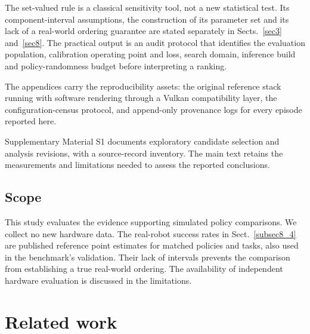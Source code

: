 \documentclass[pdflatex,iicol,sn-apa]{sn-jnl}
\theoremstyle{remark}
\begin{document}
\noindent The set-valued rule is a classical sensitivity tool, not a new statistical test. Its
component-interval assumptions, the construction of its parameter set and its lack of a real-world
ordering guarantee are stated separately in Sects.~\ref{sec3} and~\ref{sec8}. The practical output is
an audit protocol that identifies the evaluation population, calibration operating point and loss,
search domain, inference build and policy-randomness budget before interpreting a ranking.

\noindent The appendices carry the reproducibility assets: the original reference stack running
with software rendering through a Vulkan compatibility layer, the
configuration-census protocol, and append-only provenance logs for every episode reported here.

Supplementary Material S1 documents exploratory candidate selection and analysis revisions,
with a source-record inventory. The main text retains the measurements and limitations needed
to assess the reported conclusions.

\subsection{Scope}\label{subsec1_3}

This study evaluates the evidence supporting simulated policy comparisons. We collect no new
hardware data. The real-robot success rates in Sect.~\ref{subsec8_4} are published reference point
estimates for matched policies and tasks, also used in the benchmark's validation. Their lack of
intervals prevents the comparison from establishing a true real-world ordering. The availability
of independent hardware evaluation is discussed in the limitations.

\section{Related work}\label{sec2}
\end{document}
